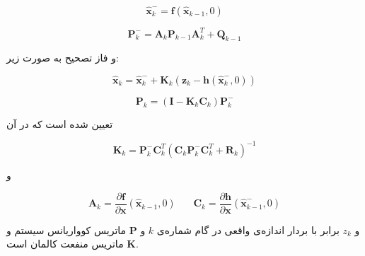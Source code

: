 \documentclass[11pt, fleqn]{article}
\begin{document}
\begin{multicols}{2}
\useshortskip
\begin{LTR}
\begin{equation}
\label{19}
\hat{\mathbf{x}}^{-}_{k} = \mathbf{f}(\hat{\mathbf{x}}_{k-1},0)
\end{equation}
\end{LTR}

\useshortskip
\begin{LTR}
\begin{equation}
\label{20}
\mathbf{P}^{-}_{k} = \mathbf{A}_{k}\mathbf{P}_{k-1}\mathbf{A}^{T}_{k}+\mathbf{Q}_{k-1}
\end{equation}
\end{LTR}
و فاز تصحیح به صورت زیر:


\useshortskip
\begin{LTR}
\begin{equation}
\label{21}
\hat{\mathbf{x}}_{k} = \hat{\mathbf{x}}^{-}_{k}+\mathbf{K}_{k}(\mathbf{z}_k - \mathbf{h}(\hat{\mathbf{x}}^{-}_{k},0))
\end{equation}
\end{LTR}

\useshortskip
\begin{LTR}
\begin{equation}
\label{22}
\mathbf{P}_k = (\mathbf{I} - \mathbf{K}_{k} \mathbf{C}_{k}
)\mathbf{P}^{-}_{k}
\end{equation}
\end{LTR}

تعیین شده است که در آن


\useshortskip
\begin{LTR}
\begin{equation}
\label{23}
\mathbf{K}_k = \mathbf{P}^{-}_{k} \mathbf{C}^{T}_{k}(\mathbf{C}_{k}  \mathbf{P}^{-}_{k} \mathbf{C}^{T}_{k} + \mathbf{R}_k)^{-1}
\end{equation}
\end{LTR}

و


\useshortskip
\begin{LTR}
\begin{equation}
\label{24}
\mathbf{A}_k = \frac{\partial \mathbf{f}}{\partial \mathbf{x}}(\hat{\mathbf{x}}_{k-1},0) \ \ \ \ \ \ \ \ \mathbf{C}_k =  \frac{\partial \mathbf{h}}{\partial \mathbf{x}}(\hat{\mathbf{x}}^{-}_{k-1},0)
\end{equation}
\end{LTR}

و
$z_k$
برابر با بردار‌ اندازه‌ی واقعی در گام شماره‌ی
$k$
و
 $\mathbf{P}$ 
 ماتریس کوواریانس سیستم و 
  $\mathbf{K}$ 
   ماتریس منفعت کالمان 
  است. 



\end{multicols}
\end{document}
